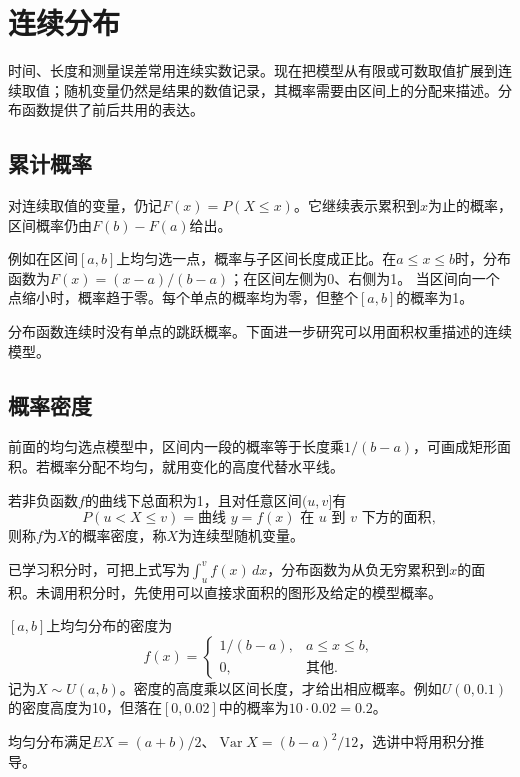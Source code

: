 \FloatBarrier
\newpage
\section{连续分布}
\label{sec:prob-continuous}

时间、长度和测量误差常用连续实数记录。现在把模型从有限或可数取值扩展到连续取值；随机变量仍然是结果的数值记录，其概率需要由区间上的分配来描述。分布函数提供了前后共用的表达。

\subsection{累计概率}

对连续取值的变量，仍记\(F(x)=P(X\le x)\)。它继续表示累积到\(x\)为止的概率，区间概率仍由\(F(b)-F(a)\)给出。

例如在区间\([a,b]\)上均匀选一点，概率与子区间长度成正比。在\(a\le x\le b\)时，分布函数为\(F(x)=(x-a)/(b-a)\)；在区间左侧为0、右侧为1。
当区间向一个点缩小时，概率趋于零。每个单点的概率均为零，但整个\([a,b]\)的概率为1。

分布函数连续时没有单点的跳跃概率。下面进一步研究可以用面积权重描述的连续模型。

\subsection{概率密度}

前面的均匀选点模型中，区间内一段的概率等于长度乘\(1/(b-a)\)，可画成矩形面积。若概率分配不均匀，就用变化的高度代替水平线。

\begin{definition}
若非负函数\(f\)的曲线下总面积为1，且对任意区间\((u,v]\)有
\[
 P(u<X\le v)=\text{曲线 }y=f(x)\text{ 在 }u\text{ 到 }v\text{ 下方的面积},
\]
则称\(f\)为\(X\)的{\heiti 概率密度}，称\(X\)为{\heiti 连续型随机变量}。
\end{definition}

已学习积分时，可把上式写为\(\int_u^v f(x)\,dx\)，分布函数为从负无穷累积到\(x\)的面积。未调用积分时，先使用可以直接求面积的图形及给定的模型概率。

\([a,b]\)上均匀分布的密度为
\[
 f(x)=\begin{cases}1/(b-a),&a\le x\le b,\\0,&\text{其他}.
 \end{cases}
\]
记为\(X\sim U(a,b)\)。密度的高度乘以区间长度，才给出相应概率。例如\(U(0,0.1)\)的密度高度为10，但落在\([0,0.02]\)中的概率为\(10\cdot0.02=0.2\)。

均匀分布满足\(EX=(a+b)/2\)、\(\operatorname{Var}X=(b-a)^2/12\)，选讲中将用积分推导。

